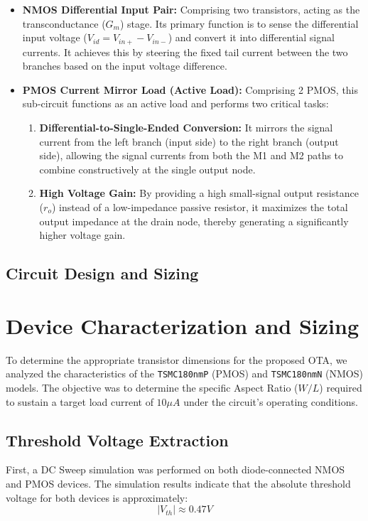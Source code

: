 \documentclass[conference]{IEEEtran}
\begin{document}
\begin{itemize}
    \item \textbf{NMOS Differential Input Pair:} 
    Comprising two transistors, acting as the transconductance ($G_m$) stage. 
    Its primary function is to sense the differential input voltage ($V_{id} = V_{in+} - V_{in-}$) and convert it into differential signal currents. 
    It achieves this by steering the fixed tail current between the two branches based on the input voltage difference.

    \item \textbf{PMOS Current Mirror Load (Active Load):} 
    Comprising 2 PMOS, this sub-circuit functions as an active load and performs two critical tasks:
    \begin{enumerate}
        \item \textbf{Differential-to-Single-Ended Conversion:} It mirrors the signal current from the left branch (input side) to the right branch (output side), 
        allowing the signal currents from both the M1 and M2 paths to combine constructively at the single output node.
        \item \textbf{High Voltage Gain:} By providing a high small-signal output resistance ($r_{o}$) instead of a low-impedance passive resistor, 
        it maximizes the total output impedance at the drain node, thereby generating a significantly higher voltage gain.
    \end{enumerate}
\end{itemize}

\subsection{Circuit Design and Sizing}

\section{Device Characterization and Sizing}

To determine the appropriate transistor dimensions for the proposed OTA, we analyzed the characteristics of the \texttt{TSMC180nmP} (PMOS) and \texttt{TSMC180nmN} (NMOS) models. The objective was to determine the specific Aspect Ratio ($W/L$) required to sustain a target load current of $10 \mu A$ under the circuit's operating conditions.

\subsection{Threshold Voltage Extraction}
First, a DC Sweep simulation was performed on both diode-connected NMOS and PMOS devices. The simulation results indicate that the absolute threshold voltage for both devices is approximately:
\[
|V_{th}| \approx 0.47 V
\]
\end{document}
